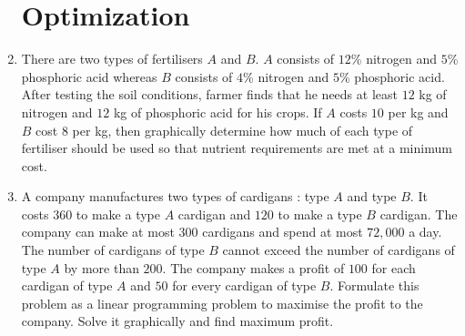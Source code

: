 \documentclass[12pt,-letter paper]{article}
\theoremstyle{remark}
\begin{document}
\begin{enumerate}
            \section{Optimization}
      \item There are two types of fertilisers $A$ and $B$. $A$ consists of $12$\% nitrogen and $5$\% phosphoric acid whereas $B$ consists of $4$\% nitrogen and $5$\% phosphoric acid. After testing the soil conditions, farmer finds that he needs at least $12$ kg of nitrogen and $12$ kg of phosphoric acid for his crops. If $A$ costs \rupee $10$ per kg and $B$ cost \rupee $8$ per kg, then graphically determine how much of each type of fertiliser should be used so that nutrient requirements are met at a minimum cost.
      \item A company manufactures two types of cardigans : type $A$ and type $B$. It costs \rupee $360$ to make a type $A$ cardigan and \rupee $120$ to make a type $B$ cardigan. The company can make at most $300$ cardigans and spend at most \rupee $72,000$ a day. The number of cardigans of type $B$ cannot exceed the number of cardigans of type $A$ by more than $200$. The company makes a profit of \rupee $100$ for each cardigan of type $A$ and \rupee $50$ for every cardigan of type $B$. Formulate this problem as a linear programming problem to maximise the profit to the company. Solve it graphically and find maximum profit.
\end{enumerate}
\end{document}
